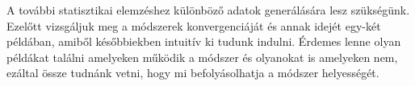 \documentclass[a4paper,12pt]{report}
\begin{document}
				A további statisztikai elemzéshez különböző adatok generálására lesz szükségünk. Ezelőtt vizsgáljuk meg a módszerek konvergenciáját és annak idejét egy-két példában, amiből későbbiekben intuitív ki tudunk indulni. Érdemes lenne olyan példákat találni amelyeken működik a módszer és olyanokat is amelyeken nem, ezáltal össze tudnánk vetni, hogy mi befolyásolhatja a módszer helyességét.
				
                
                
                
                
                
                
                
                
                

                
                
                
                
                
                
                
                
                
                
                
                
\end{document}
